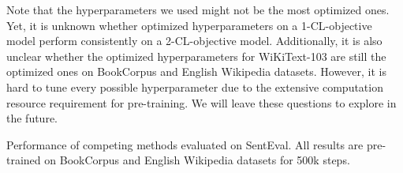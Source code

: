 \documentclass[11pt,a4paper]{article}
\begin{document}
Note that the hyperparameters we used might not be the most optimized ones. Yet, it is unknown whether optimized hyperparameters on a 1-CL-objective model perform consistently on a 2-CL-objective model. Additionally, it is also unclear whether the optimized hyperparameters for WiKiText-103 are still the optimized ones on BookCorpus and English Wikipedia datasets. However, it is hard to tune every possible hyperparameter due to the extensive computation resource requirement for pre-training. We will leave these questions to explore in the future. 

\begin{table*}[t]
\caption{Performance of competing methods evaluated on SentEval. All results are pre-trained on BookCorpus and English Wikipedia datasets for 500k steps.}
\label{tab:senteval}
\centering
\setlength{\tabcolsep}{8pt}
\renewcommand{\arraystretch}{1.2}
\begin{adjustbox}{max width=\textwidth}


\end{adjustbox}
\end{table*}
\end{document}
